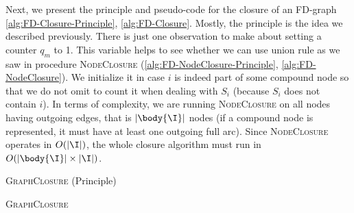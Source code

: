 \vspace{1.2em}

Next, we present the principle and pseudo-code for the closure of an FD-graph
\ref{alg:FD-Closure-Principle}, \ref{alg:FD-Closure}. Mostly, the principle is 
the idea we described previously. There is just one observation to make about 
setting a counter $q_m$ to 1. This variable helps to see whether we can use 
union rule as we saw in procedure \textsc{NodeClosure}
(\ref{alg:FD-NodeClosure-Principle}, \ref{alg:FD-NodeClosure}). We initialize it
in case $i$ is indeed part of some compound node so that we do not omit to count
it when dealing with $S_i$ (because $S_i$ does not contain $i$). In terms of
complexity, we are running \textsc{NodeClosure} on all nodes having outgoing
edges, that is $|\body{\I}|$ nodes (if a compound node is represented, it must
have at least one outgoing full arc). Since \textsc{NodeClosure} operates in
$O(|\I|)$, the whole closure algorithm must run in $O(|\body{\I}| \times |\I|)$.

\begin{algorithm}
	
	\BlankLine
	\BlankLine
	
	
	\caption{\textsc{GraphClosure} (Principle)}
	\label{alg:FD-Closure-Principle}
\end{algorithm}

\begin{algorithm}
	
	\BlankLine
	\BlankLine
	
	
	\caption{\textsc{GraphClosure}}
	\label{alg:FD-Closure}
\end{algorithm}

